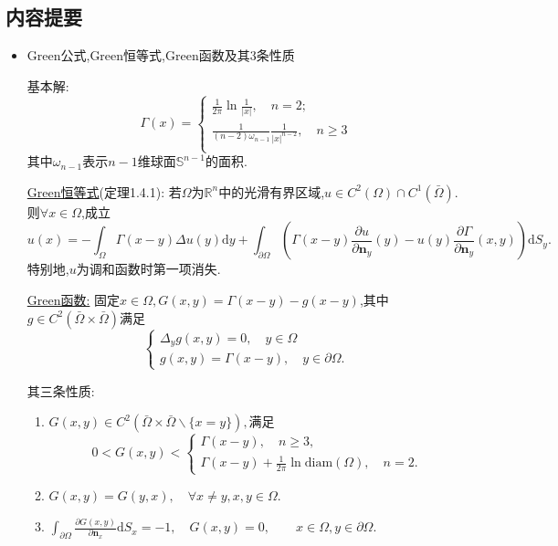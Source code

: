 \documentclass[12pt, a4paper]{ctexbook}
\newcommand{\dy}{\text{d}y}
\newcommand{\dS}{\text{d}S}
\begin{document}
    \subsection{内容提要}
    \begin{itemize}
        \item Green公式,Green恒等式,Green函数及其3条性质
        
        基本解:
        $$\Gamma(x) = \begin{cases}
        \frac1{2\pi}\ln\frac{1}{|x|},\quad n=2;\\
        \frac1{(n-2)\omega_{n-1}}\frac1{|x|^{n-2}},\quad n\geq 3\\
        \end{cases}$$
        其中$\omega_{n-1}$表示$n-1$维球面$\mathbb{S}^{n-1}$的面积.
        
        \uline{Green恒等式}(定理1.4.1): 若$\Omega$为$\mathbb{R}^n$中的光滑有界区域,$u\in C^2(\Omega)\cap C^1(\bar{\Omega}).$则$\forall x\in \Omega$,成立
        $$u(x) = - \int_\Omega \Gamma(x-y)\Delta u(y)\dy + \int_{\partial\Omega}(\Gamma(x-y)\frac{\partial u}{\partial \bm n_y}(y) - u(y)\frac{\partial\Gamma}{\partial\bm n_y}(x, y))\dS_y.$$
        特别地,$u$为调和函数时第一项消失.
        
        \uline{Green函数:} 固定$x\in\Omega, G(x, y) = \Gamma(x-y) - g(x-y)$,其中$g\in C^2(\bar\Omega \times \bar\Omega)$满足
        $$\begin{cases}
        \Delta_y g(x,y) = 0, \quad y\in\Omega\\
        g(x, y) = \Gamma(x-y), \quad y\in\partial \Omega.
        \end{cases}$$
        
        其三条性质:
        \begin{enumerate}
            \item $G(x, y)\in C^2(\bar \Omega \times \bar \Omega \backslash\{x=y\}),$满足$$ 0 < G(x,y) < \begin{cases}
            \Gamma(x-y),\quad n\geq 3,\\
            \Gamma(x-y) +\frac1{2\pi}\ln\text{diam}(\Omega),\quad n=2.
            \end{cases}$$
            \item $G(x, y) = G(y, x),\quad \forall x \neq y, x, y\in \Omega.$
            \item $\int_{\partial\Omega}\frac{\partial G(x,y)}{\partial\bm n_x}\dS_x = -1, \quad G(x,y) = 0, \qquad x\in\Omega, y\in\partial\Omega.$
        \end{enumerate}
        

\end{itemize}
\end{document}
